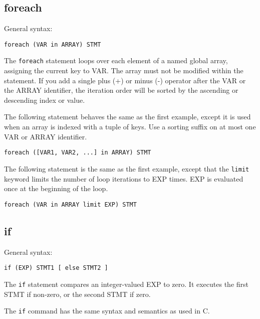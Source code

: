 \documentclass[twoside,english]{article}
\newenvironment{vindent}
{\begin{list}{}{\setlength{\listparindent}{6pt}}
\item[]}
{\end{list}}
\begin{document}
\subsection{foreach\label{sub:foreach}}
General syntax:
\begin{vindent}
\begin{verbatim}
foreach (VAR in ARRAY) STMT
\end{verbatim}
\end{vindent}
The \texttt{foreach} statement loops over each element of a named global array, assigning
the current key to VAR. The array must not be modified within the statement.
If you add a single plus (+) or minus (-) operator after the VAR or the ARRAY
identifier, the iteration order will be sorted by the ascending or descending
index or value.

The following statement behaves the same as the first example, except it
is used when an array is indexed with a tuple of keys.  Use a sorting suffix
on at most one VAR or ARRAY identifier.

\begin{vindent}
\begin{verbatim}
foreach ([VAR1, VAR2, ...] in ARRAY) STMT
\end{verbatim}
\end{vindent}
The following statement is the same as the first example, except that the
\texttt{limit} keyword limits the number of loop iterations to EXP times.
EXP is evaluated once at the beginning of the loop.

\begin{vindent}
\begin{verbatim}
foreach (VAR in ARRAY limit EXP) STMT
\end{verbatim}
\end{vindent}

\subsection{if}
General syntax:

\begin{vindent}
\begin{verbatim}
if (EXP) STMT1 [ else STMT2 ]
\end{verbatim}
\end{vindent}
The \texttt{if} statement compares an integer-valued EXP to zero. It executes
the first STMT if non-zero, or the second STMT if zero.

The \texttt{if} command has the same syntax and semantics as used in C.
\end{document}
